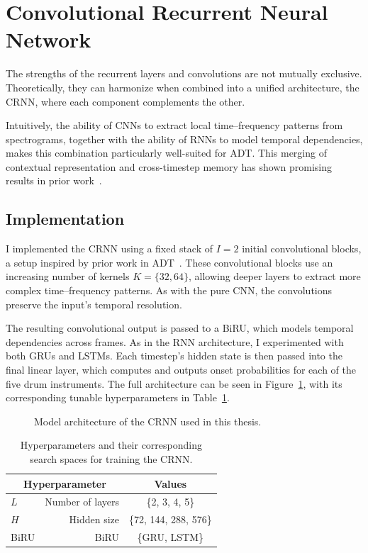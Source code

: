 \section[Convolutional RNN]{Convolutional Recurrent Neural Network}

The strengths of the recurrent layers and convolutions are not mutually exclusive. Theoretically, they can harmonize when combined into a unified architecture, the \gls{CRNN}, where each component complements the other.

Intuitively, the ability of \glspl{CNN} to extract local time–frequency patterns from spectrograms, together with the ability of \glspl{RNN} to model temporal dependencies, makes this combination particularly well-suited for \gls{ADT}. This merging of contextual representation and cross-timestep memory has shown promising results in prior work~\cite{Vogl2017DrumTV, vogl2018multiinstrumentdrumtranscription, signals4040042}.

\subsection{Implementation}

I implemented the \gls{CRNN} using a fixed stack of $I = 2$ initial convolutional blocks, a setup inspired by prior work in \gls{ADT}~\cite{Vogl2017DrumTV, signals4040042}. These convolutional blocks use an increasing number of kernels $K = \{32, 64\}$, allowing deeper layers to extract more complex time–frequency patterns. As with the pure \gls{CNN}, the convolutions preserve the input's temporal resolution.

The resulting convolutional output is passed to a \gls{BiRU}, which models temporal dependencies across frames. As in the \gls{RNN} architecture, I experimented with both \glspl{GRU} and \glspl{LSTM}. Each timestep's hidden state is then passed into the final linear layer, which computes and outputs onset probabilities for each of the five drum instruments. The full architecture can be seen in Figure~\ref{CRNNFigure}, with its corresponding tunable hyperparameters in Table~\ref{CRNNHyperparams}.

\begin{figure}[H]
    \centering
    
    \caption{Model architecture of the \acrlong{CRNN} used in this thesis.}
    \label{CRNNFigure}
\end{figure}

\begin{table}[H]
    \centering
    \begin{tabular}{lr|c}
        \multicolumn{2}{c|}{Hyperparameter} & Values       \\
        \hline
        $L$ & Number of layers      & \{2, 3, 4, 5\} \\
        $H$ & Hidden size      & \{72, 144, 288, 576\} \\
        \gls{BiRU} & \acrlong{BiRU} & \{\gls{GRU}, \gls{LSTM}\}\\
    \end{tabular}
    \caption{Hyperparameters and their corresponding search spaces for training the \acrlong{CRNN}.}
    \label{CRNNHyperparams}
\end{table}

